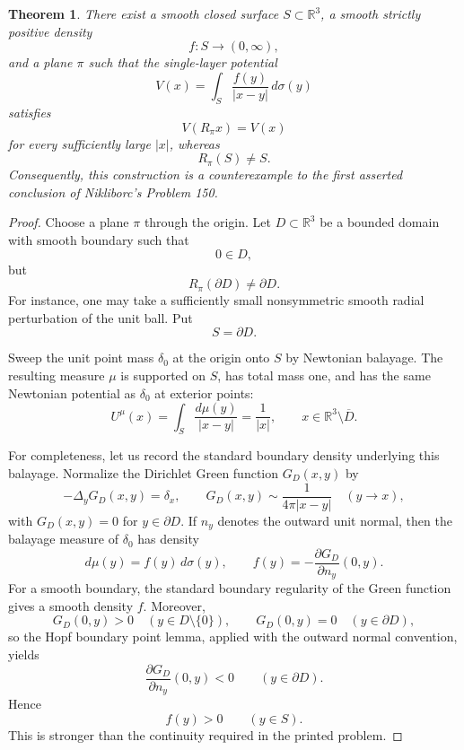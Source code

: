 \documentclass[11pt]{article}
\newtheorem{theorem}{Theorem}[section]
\begin{document}
\begin{theorem}\label{thm:main}
There exist a smooth closed surface $S\subset\mathbb R^3$, a smooth strictly positive density
\[
  f:S\longrightarrow (0,\infty),
\]
and a plane $\pi$ such that the single-layer potential
\[
  V(x)=\int_S \frac{f(y)}{|x-y|}\,d\sigma(y)
\]
satisfies
\[
  V(R_\pi x)=V(x)
\]
for every sufficiently large $|x|$, whereas
\[
  R_\pi(S)\neq S.
\]
Consequently, this construction is a counterexample to the first asserted conclusion of Nikliborc's Problem 150.
\end{theorem}

\begin{proof}
Choose a plane $\pi$ through the origin. Let $D\subset\mathbb R^3$ be a bounded domain with smooth boundary such that
\[
  0\in D,
\]
but
\[
  R_\pi(\partial D)\neq \partial D.
\]
For instance, one may take a sufficiently small nonsymmetric smooth radial perturbation of the unit ball. Put
\[
  S=\partial D.
\]

Sweep the unit point mass $\delta_0$ at the origin onto $S$ by Newtonian balayage. The resulting measure $\mu$ is supported on $S$, has total mass one, and has the same Newtonian potential as $\delta_0$ at exterior points:
\begin{equation}\label{eq:balayage}
  U^\mu(x)
  =\int_S \frac{d\mu(y)}{|x-y|}
  =\frac{1}{|x|},
  \qquad x\in\mathbb R^3\setminus\overline D.
\end{equation}

For completeness, let us record the standard boundary density underlying this balayage. Normalize the Dirichlet Green function $G_D(x,y)$ by
\[
  -\Delta_y G_D(x,y)=\delta_x,
  \qquad
  G_D(x,y)\sim \frac{1}{4\pi|x-y|}
  \quad (y\to x),
\]
with $G_D(x,y)=0$ for $y\in\partial D$. If $n_y$ denotes the outward unit normal, then the balayage measure of $\delta_0$ has density
\begin{equation}\label{eq:density}
  d\mu(y)=f(y)\,d\sigma(y),
  \qquad
  f(y)=-\frac{\partial G_D}{\partial n_y}(0,y).
\end{equation}
For a smooth boundary, the standard boundary regularity of the Green function gives a smooth density $f$. Moreover,
\[
  G_D(0,y)>0\quad (y\in D\setminus\{0\}),
  \qquad
  G_D(0,y)=0\quad (y\in\partial D),
\]
so the Hopf boundary point lemma, applied with the outward normal convention, yields
\[
  \frac{\partial G_D}{\partial n_y}(0,y)<0
  \qquad (y\in\partial D).
\]
Hence
\[
  f(y)>0\qquad (y\in S).
\]
This is stronger than the continuity required in the printed problem.


\end{proof}
\end{document}
